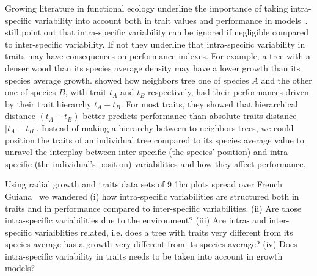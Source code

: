 Growing literature in functional ecology underline the importance of taking intra-specific variability into account both in trait values and performance in models~\citep{violle_towards_2009, clark_high-dimensional_2010, albert_when_2011, violle_return_2012}.~\citet{albert_when_2011} still point out that intra-specific variability can be ignored if negligible compared to inter-specific variability. If not they underline that intra-specific variability in traits may have consequences on performance indexes. For example, a tree with a denser wood than its species average density may have a lower growth than its species average growth. \citet{kunstler_competitive_2012} showed how neighbors tree one of species $A$ and the other one of species $B$, with trait $t_A$ and $t_B$ respectively, had their performances driven by their trait hierarchy $t_A - t_B$. For most traits, they showed that hierarchical distance $(t_A - t_B)$ better predicts performance than absolute traits distance $\vert t_A - t_B \vert$. Instead of making a hierarchy between to neighbors trees, we could position the traits of an individual tree compared to its species average value to unravel the interplay between inter-specific (the species' position) and intra-specific (the individual's position) variabilities and how they affect performance.

Using radial growth and traits data sets of 9 1ha plots spread over French Guiana~\citep{baraloto_decoupled_2010} we wandered (i) how intra-specific variabilities are structured both in traits and in performance compared to inter-specific variabilities. (ii) Are those intra-specific variabilities due to the environment? (iii) Are intra- and inter- specific variaiblities related, i.e. does a tree with traits very different from its species average has a growth very different from its species average? (iv) Does intra-specific variability in traits needs to be taken into account in growth models?